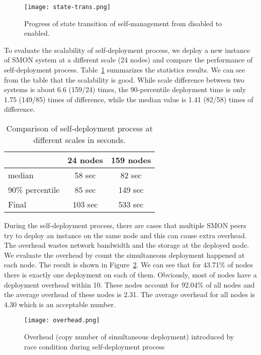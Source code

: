 \begin{figure}
\centering
\texttt{[image: state-trans.png]}
\caption{Progress of state transition of self-management from disabled to
enabled.}
\label{fig:state-transition}
\end{figure}


To evaluate the scalability of self-deployment process, we deploy
a new instance of SMON system at a different scale (24 nodes) and
compare the performance of self-deployment process.
Table~\ref{tbl:scalability} summarizes the statistics results.
We can see from the table that the scalability is good.
While scale difference between two systems is about 6.6
(159/24) times, the
90-percentile deployment time is only 1.75 (149/85) times of
difference, while the median value is 1.41 (82/58) times of
difference.

\begin{table}
\centering
\begin{tabular}{|l|c|c|}
\hline
  & 24 nodes & 159 nodes\\
\hline
median & 58 sec & 82 sec \\
\hline
90\% percentile & 85 sec & 149 sec\\
\hline
Final & 103 sec & 533 sec\\
\hline
\end{tabular}
\caption{Comparison of self-deployment process at different
scales in seconds.}
\label{tbl:scalability}
\end{table}

During the self-deployment process, there are cases that
multiple SMON peers try to deploy an instance on the same
node and this can cause extra overhead. The overhead wastes
network bandwidth and the storage at the deployed node. We
evaluate the overhead by count the simultaneous deployment
happened at each node. The result is shown in
Figure~\ref{fig:overhead}. We can see that for 43.71\% of
nodes there is exactly one deployment on each of them.
Obviously, most of nodes have a deployment overhead within
10. These nodes account for 92.04\% of all nodes and the
average overhead of these nodes is 2.31. The average
overhead for all nodes is 4.30 which is an acceptable
number.

\begin{figure}
\centering
\texttt{[image: overhead.png]}
\caption{Overhead (copy number of simultaneous deployment)
introduced by race condition during
self-deployment process}
\label{fig:overhead}
\end{figure}


